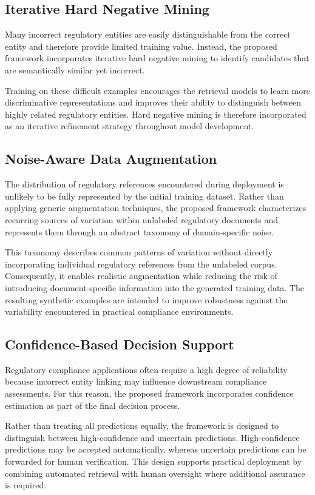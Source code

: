\subsection{Iterative Hard Negative Mining}

Many incorrect regulatory entities are easily distinguishable from the correct entity and therefore provide limited training value. Instead, the proposed framework incorporates iterative hard negative mining to identify candidates that are semantically similar yet incorrect.

Training on these difficult examples encourages the retrieval models to learn more discriminative representations and improves their ability to distinguish between highly related regulatory entities. Hard negative mining is therefore incorporated as an iterative refinement strategy throughout model development.

\subsection{Noise-Aware Data Augmentation}

The distribution of regulatory references encountered during deployment is unlikely to be fully represented by the initial training dataset. Rather than applying generic augmentation techniques, the proposed framework characterizes recurring sources of variation within unlabeled regulatory documents and represents them through an abstract taxonomy of domain-specific noise.

This taxonomy describes common patterns of variation without directly incorporating individual regulatory references from the unlabeled corpus. Consequently, it enables realistic augmentation while reducing the risk of introducing document-specific information into the generated training data. The resulting synthetic examples are intended to improve robustness against the variability encountered in practical compliance environments.

\subsection{Confidence-Based Decision Support}

Regulatory compliance applications often require a high degree of reliability because incorrect entity linking may influence downstream compliance assessments. For this reason, the proposed framework incorporates confidence estimation as part of the final decision process.

Rather than treating all predictions equally, the framework is designed to distinguish between high-confidence and uncertain predictions. High-confidence predictions may be accepted automatically, whereas uncertain predictions can be forwarded for human verification. This design supports practical deployment by combining automated retrieval with human oversight where additional assurance is required.